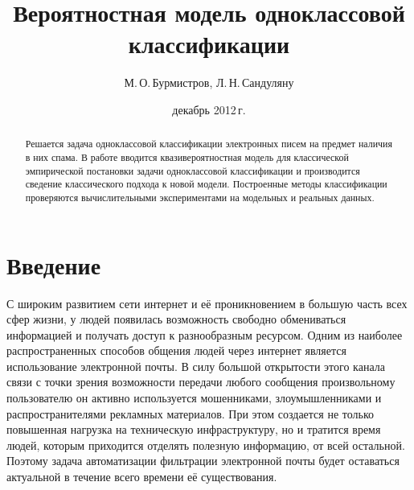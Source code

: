 \documentclass[12pt]{article}
\begin{document}
	\title{Вероятностная модель одноклассовой классификации}
	\author{М.\,О.\,Бурмистров, Л.\,Н.\,Сандуляну}
	\address{Московский физико-технический институт, ФУПМ, каф. <<Интеллектуальные системы>>}
	\date{декабрь 2012\,г.}

	\begin{abstract}
	Решается задача одноклассовой классификации электронных писем на предмет наличия в них спама. 
	В работе вводится квазивероятностная модель для классической эмпирической постановки задачи одноклассовой классификации и 
	производится сведение классического подхода к новой модели.
	Построенные методы классификации проверяются вычислительными экспериментами на модельных и реальных данных.
	\end{abstract}

\maketitle
\section{Введение} 							
	С широким развитием сети интернет и её проникновением в большую часть всех сфер жизни, у людей появилась возможность свободно обмениваться информацией и получать доступ к разнообразным ресурсом. 
	Одним из наиболее распространенных способов общения людей через интернет является использование электронной почты. 
	В силу большой открытости этого канала связи с точки зрения возможности передачи любого сообщения произвольному пользователю он активно используется мошенниками, злоумышленниками и распространителями рекламных материалов. При этом создается не только повышенная нагрузка на техническую инфраструктуру, но и тратится время людей, которым приходится отделять полезную информацию, от всей остальной. 
	Поэтому задача автоматизации фильтрации электронной почты будет оставаться актуальной в течение всего времени её существования.
\end{document}
